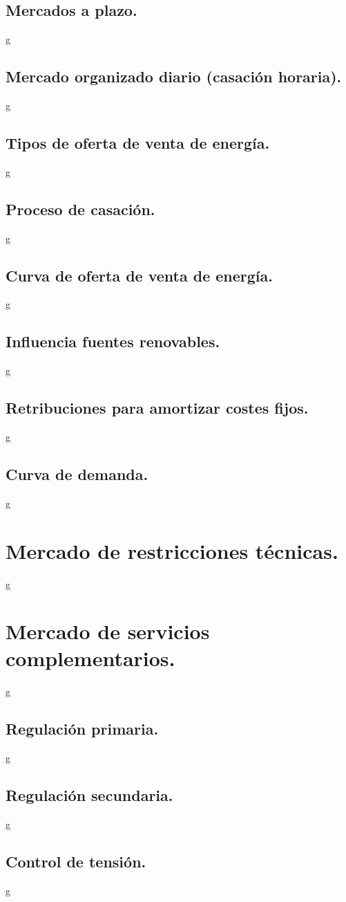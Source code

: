 \subsection{Mercados a plazo.}
g
\subsection{Mercado organizado diario (casación horaria).}
g
\subsection{Tipos de oferta de venta de energía.}
g
\subsection{Proceso de casación.}
g
\subsection{Curva de oferta de venta de energía.}
g
\subsection{Influencia fuentes renovables.}
g
\subsection{Retribuciones para amortizar costes fijos.}
g
\subsection{Curva de demanda.}
g
\section{Mercado de restricciones técnicas.}
g
\section{Mercado de servicios complementarios.}
g
\subsection{Regulación primaria.}
g
\subsection{Regulación secundaria.}
g
\subsection{Control de tensión.}
g
